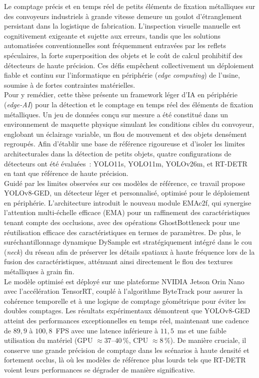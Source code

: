 Le comptage précis et en temps réel de petits éléments de fixation métalliques sur des convoyeurs industriels à grande vitesse demeure un goulot d'étranglement persistant dans la logistique de fabrication. L'inspection visuelle manuelle est cognitivement exigeante et sujette aux erreurs, tandis que les solutions automatisées conventionnelles sont fréquemment entravées par les reflets spéculaires, la forte superposition des objets et le coût de calcul prohibitif des détecteurs de haute précision. Ces défis empêchent collectivement un déploiement fiable et continu sur l'informatique en périphérie (\textit{edge computing}) de l'usine, soumise à de fortes contraintes matérielles.\\

Pour y remédier, cette thèse présente un framework léger d'IA en périphérie (\textit{edge-AI}) pour la détection et le comptage en temps réel des éléments de fixation métalliques. Un jeu de données conçu sur mesure a été constitué dans un environnement de maquette physique simulant les conditions cibles du convoyeur, englobant un éclairage variable, un flou de mouvement et des objets densément regroupés. Afin d'établir une base de référence rigoureuse et d'isoler les limites architecturales dans la détection de petits objets, quatre configurations de détecteurs ont été évaluées~: YOLO11s, YOLO11m, YOLOv26m, et RT-DETR en tant que référence de haute précision.\\

Guidé par les limites observées sur ces modèles de référence, ce travail propose YOLOv8-GED, un détecteur léger et personnalisé, optimisé pour le déploiement en périphérie. L'architecture introduit le nouveau module EMAc2f, qui synergise l'attention multi-échelle efficace (EMA) pour un raffinement des caractéristiques tenant compte des occlusions, avec des opérations GhostBottleneck pour une réutilisation efficace des caractéristiques en termes de paramètres. De plus, le suréchantillonnage dynamique DySample est stratégiquement intégré dans le cou (\textit{neck}) du réseau afin de préserver les détails spatiaux à haute fréquence lors de la fusion des caractéristiques, atténuant ainsi directement le flou des textures métalliques à grain fin.\\

Le modèle optimisé est déployé sur une plateforme NVIDIA Jetson Orin Nano avec l'accélération TensorRT, couplé à l'algorithme ByteTrack pour assurer la cohérence temporelle et à une logique de comptage géométrique pour éviter les doubles comptages. Les résultats expérimentaux démontrent que YOLOv8-GED atteint des performances exceptionnelles en temps réel, maintenant une cadence de $89,9$ à $100,8$~FPS avec une latence inférieure à $11,5$~ms et une faible utilisation du matériel (GPU $\approx 37$--$40\,\%$, CPU $\approx 8\,\%$). De manière cruciale, il conserve une grande précision de comptage dans les scénarios à haute densité et fortement occlus, là où les modèles de référence plus lourds tels que RT-DETR voient leurs performances se dégrader de manière significative.\\


